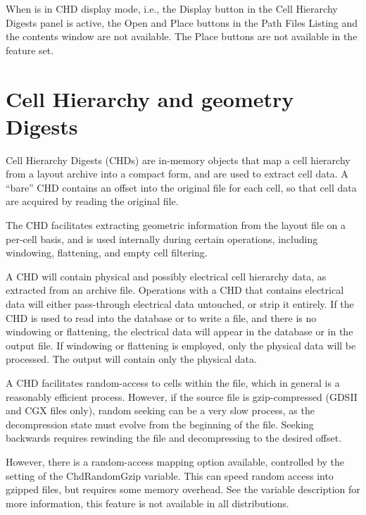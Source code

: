When {\Xic} is in CHD display mode, i.e., the {\cb Display} button in
the {\cb Cell Hierarchy Digests} panel is active, the {\cb Open} and
{\cb Place} buttons in the {\cb Path Files Listing} and the contents
window are not available.  The {\cb Place} buttons are not available
in the {\Xiv} feature set. 


\section{Cell Hierarchy and geometry Digests}
Cell Hierarchy Digests (CHDs) are in-memory objects that map a cell
hierarchy from a layout archive into a compact form, and are used to
extract cell data.  A ``bare'' CHD contains an offset into the
original file for each cell, so that cell data are acquired by reading
the original file.

The CHD facilitates extracting geometric information from the layout
file on a per-cell basis, and is used internally during certain
operations, including windowing, flattening, and empty cell filtering.

A CHD will contain physical and possibly electrical cell hierarchy
data, as extracted from an archive file.  Operations with a CHD that
contains electrical data will either pass-through electrical data
untouched, or strip it entirely.  If the CHD is used to read into the
database or to write a file, and there is no windowing or flattening,
the electrical data will appear in the database or in the output file. 
If windowing or flattening is employed, only the physical data will be
processed.  The output will contain only the physical data.

A CHD facilitates random-access to cells within the file, which in
general is a reasonably efficient process.  However, if the source
file is gzip-compressed (GDSII and CGX files only), random seeking can
be a very slow process, as the decompression state must evolve from
the beginning of the file.  Seeking backwards requires rewinding the
file and decompressing to the desired offset.

However, there is a random-access mapping option available, controlled
by the setting of the {\et ChdRandomGzip} variable.  This can speed
random access into gzipped files, but requires some memory overhead. 
See the variable description for more information, this feature is not
available in all {\Xic} distributions.

